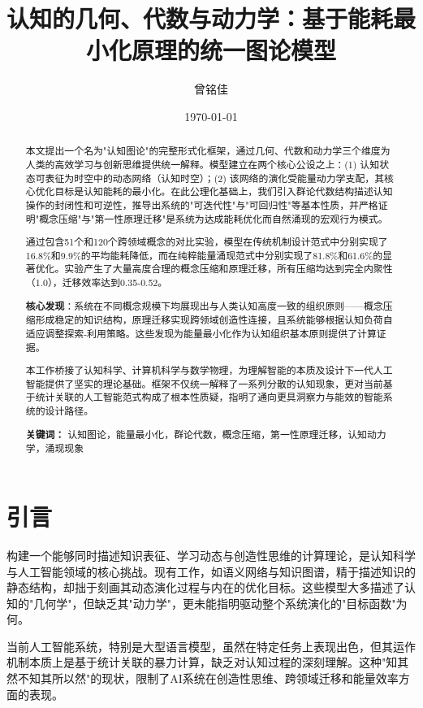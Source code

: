 \documentclass[12pt,a4paper]{article}
\title{认知的几何、代数与动力学：基于能耗最小化原理的统一图论模型}
\author{曾铭佳}
\date{\today}
\begin{document}
\maketitle

\begin{abstract}
本文提出一个名为"认知图论"的完整形式化框架，通过几何、代数和动力学三个维度为人类的高效学习与创新思维提供统一解释。模型建立在两个核心公设之上：(1) 认知状态可表征为时空中的动态网络（认知时空）；(2) 该网络的演化受能量动力学支配，其核心优化目标是认知能耗的最小化。在此公理化基础上，我们引入群论代数结构描述认知操作的封闭性和可逆性，推导出系统的"可迭代性"与"可回归性"等基本性质，并严格证明"概念压缩"与"第一性原理迁移"是系统为达成能耗优化而自然涌现的宏观行为模式。

通过包含51个和120个跨领域概念的对比实验，模型在传统机制设计范式中分别实现了16.8\%和9.9\%的平均能耗降低，而在纯粹能量涌现范式中分别实现了81.8\%和61.6\%的显著优化。实验产生了大量高度合理的概念压缩和原理迁移，所有压缩均达到完全内聚性（1.0），迁移效率达到0.35-0.52。

\textbf{核心发现}：系统在不同概念规模下均展现出与人类认知高度一致的组织原则——概念压缩形成稳定的知识结构，原理迁移实现跨领域创造性连接，且系统能够根据认知负荷自适应调整探索-利用策略。这些发现为能量最小化作为认知组织基本原则提供了计算证据。

本工作桥接了认知科学、计算机科学与数学物理，为理解智能的本质及设计下一代人工智能提供了坚实的理论基础。框架不仅统一解释了一系列分散的认知现象，更对当前基于统计关联的人工智能范式构成了根本性质疑，指明了通向更具洞察力与能效的智能系统的设计路径。

\textbf{关键词：} 认知图论，能量最小化，群论代数，概念压缩，第一性原理迁移，认知动力学，涌现现象
\end{abstract}

\section{引言}

构建一个能够同时描述知识表征、学习动态与创造性思维的计算理论，是认知科学与人工智能领域的核心挑战。现有工作，如语义网络与知识图谱，精于描述知识的静态结构，却拙于刻画其动态演化过程与内在的优化目标。这些模型大多描述了认知的"几何学"，但缺乏其"动力学"，更未能指明驱动整个系统演化的"目标函数"为何。

当前人工智能系统，特别是大型语言模型，虽然在特定任务上表现出色，但其运作机制本质上是基于统计关联的暴力计算，缺乏对认知过程的深刻理解。这种"知其然不知其所以然"的现状，限制了AI系统在创造性思维、跨领域迁移和能量效率方面的表现。
\end{document}
